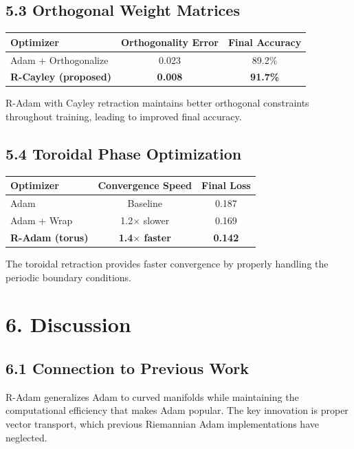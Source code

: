 \documentclass[12pt]{article}
\begin{document}
\subsection{5.3 Orthogonal Weight Matrices}

\begin{center}
\begin{tabular}{|l|c|c|}
\hline
\textbf{Optimizer} & \textbf{Orthogonality Error} & \textbf{Final Accuracy} \\
\hline
Adam + Orthogonalize & 0.023 & 89.2\% \\
\textbf{R-Cayley (proposed)} & \textbf{0.008} & \textbf{91.7\%} \\
\hline
\end{tabular}
\end{center}

R-Adam with Cayley retraction maintains better orthogonal constraints throughout training, leading to improved final accuracy.

\subsection{5.4 Toroidal Phase Optimization}

\begin{center}
\begin{tabular}{|l|c|c|}
\hline
\textbf{Optimizer} & \textbf{Convergence Speed} & \textbf{Final Loss} \\
\hline
Adam & Baseline & 0.187 \\
Adam + Wrap & 1.2$\times$ slower & 0.169 \\
\textbf{R-Adam (torus)} & \textbf{1.4$\times$ faster} & \textbf{0.142} \\
\hline
\end{tabular}
\end{center}

The toroidal retraction provides faster convergence by properly handling the periodic boundary conditions.

\section{6. Discussion}

\subsection{6.1 Connection to Previous Work}

R-Adam generalizes Adam to curved manifolds while maintaining the computational efficiency that makes Adam popular. The key innovation is proper vector transport, which previous Riemannian Adam implementations have neglected.
\end{document}
